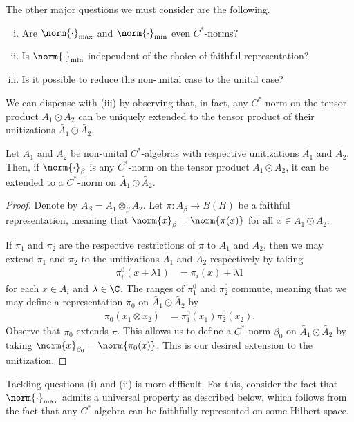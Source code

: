 \documentclass[10pt]{mypackage}
\begin{document}
The other major questions we must consider are the following.
\begin{enumerate}[(i)]
  \item Are $\norm{\cdot}_{\max}$ and $\norm{\cdot}_{\min}$ even $C^{\ast}$-norms?
  \item Is $\norm{\cdot}_{\min}$ independent of the choice of faithful representation?
  \item Is it possible to reduce the non-unital case to the unital case?
\end{enumerate}
We can dispense with (iii) by observing that, in fact, any $C^{\ast}$-norm on the tensor product $A_1\odot A_2$ can be uniquely extended to the tensor product of their unitizations $ \widetilde{A_1}\odot \widetilde{A_2} $.
\begin{proposition}
  Let $A_1$ and $A_2$ be non-unital $C^{\ast}$-algebras with respective unitizations $ \widetilde{A_1} $ and $\widetilde{A_2}$. Then, if $\norm{\cdot}_{\beta}$ is any $C^{\ast}$-norm on the tensor product $A_1\odot A_2$, it can be extended to a $C^{\ast}$-norm on $ \widetilde{A_1}\odot \widetilde{A_2} $.
\end{proposition}
\begin{proof}
  Denote by $A_{\beta} = A_1\otimes_{\beta}A_2$. Let $\pi\colon A_{\beta}\rightarrow B(H)$ be a faithful representation, meaning that $\norm{x}_{\beta} = \norm{\pi(x)}$ for all $x\in A_1\odot A_2$.

  If $\pi_1$ and $\pi_2$ are the respective restrictions of $\pi$ to $A_1$ and $A_2$, then we may extend $\pi_1$ and $\pi_2$ to the unitizations $\widetilde{A_1}$ and $\widetilde{A_2}$ respectively by taking
  \begin{align*}
    \pi_i^0\left( x + \lambda 1 \right) &= \pi_i(x) + \lambda 1
  \end{align*}
  for each $x\in A_i$ and $\lambda\in \C$. The ranges of $\pi_1^0$ and $\pi_2^0$ commute, meaning that we may define a representation $\pi_0$ on $ \widetilde{A_1}\odot \widetilde{A_2} $ by
  \begin{align*}
    \pi_0\left( x_1\otimes x_2 \right) &= \pi_1^0\left( x_1 \right) \pi_2^{0}\left( x_2 \right).
  \end{align*}
  Observe that $\pi_0$ extends $\pi$. This allows us to define a $C^{\ast}$-norm $\beta_0$ on $\widetilde{A_1}\odot \widetilde{A_2}$ by taking $\norm{x}_{\beta_0} = \norm{\pi_0(x)}$. This is our desired extension to the unitization.
\end{proof}
Tackling questions (i) and (ii) is more difficult. For this, consider the fact that $\norm{\cdot}_{\max}$ admits a universal property as described below, which follows from the fact that any $C^{\ast}$-algebra can be faithfully represented on some Hilbert space.
\end{document}

